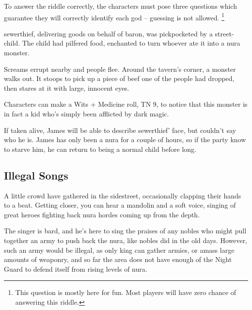 \begin{multicols}{2}
To answer the riddle correctly, the characters must pose three questions which guarantee they will correctly identify each god -- guessing is not allowed.
\footnote{This question is mostly here for fun.  Most players will have zero chance of answering this riddle.}


\Gls{sewerthief}, delivering goods on behalf of \gls{baron}, was pickpocketed by a street-child.  The child had pilfered food, enchanted to turn whoever ate it into a nura monster.

\begin{boxtext}

	Screams errupt nearby and people flee.  Around the tavern's corner, a monster walks out.  It stoops to pick up a piece of beef one of the people had dropped, then stares at it with large, innocent eyes.

\end{boxtext}

Characters can make a Wits + Medicine roll, TN 9, to notice that this monster is in fact a kid who's simply been afflicted by dark magic.


\deephobgoblin

If taken alive, James will be able to describe \gls{sewerthief}' face, but couldn't say who he is.
James has only been a nura for a couple of hours, so if the party know to starve him, he can return to being a normal child before long.

\subsection{Illegal Songs}

\begin{boxtext}
	A little crowd have gathered in the sidestreet, occasionally clapping their hands to a beat.  Getting closer, you can hear a mandolin and a soft voice, singing of great heroes fighting back nura hordes coming up from the depth.
\end{boxtext}

The singer is \gls{bard}, and he's here to sing the praises of any nobles who might pull together an army to push back the nura, like nobles did in the old days.  However, such an army would be illegal, as only \gls{king} can gather armies, or amass large amounts of weaponry, and so far the area does not have enough of the Night Guard to defend itself from rising levels of nura.


\end{multicols}
